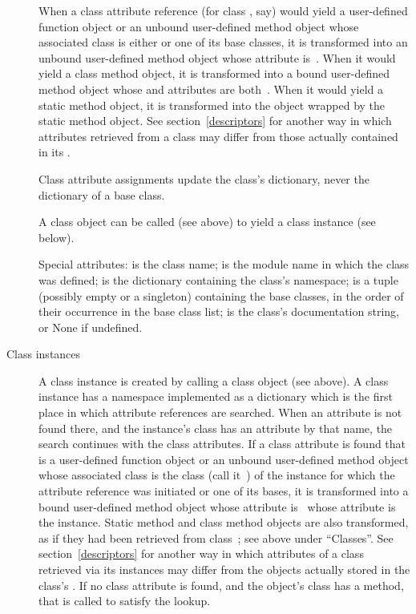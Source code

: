 \begin{description}
When a class attribute reference (for class , say)
would yield a user-defined function object or
an unbound user-defined method object whose associated class is either
 or one of its base classes, it is transformed into an unbound
user-defined method object whose  attribute is~.
When it would yield a class method object, it is transformed into
a bound user-defined method object whose  and
 attributes are both~.  When it would yield
a static method object, it is transformed into the object wrapped
by the static method object. See section~\ref{descriptors} for another
way in which attributes retrieved from a class may differ from those
actually contained in its .

Class attribute assignments update the class's dictionary, never the
dictionary of a base class.

A class object can be called (see above) to yield a class instance (see
below).

Special attributes:  is the class name;
 is the module name in which the class was defined;
 is the dictionary containing the class's namespace;
 is a tuple (possibly empty or a singleton)
containing the base classes, in the order of their occurrence in the
base class list;  is the class's documentation string,
or None if undefined.

\item[Class instances]
A class instance is created by calling a class object (see above).
A class instance has a namespace implemented as a dictionary which
is the first place in which
attribute references are searched.  When an attribute is not found
there, and the instance's class has an attribute by that name,
the search continues with the class attributes.  If a class attribute
is found that is a user-defined function object or an unbound
user-defined method object whose associated class is the class
(call it~) of the instance for which the attribute reference
was initiated or one of its bases,
it is transformed into a bound user-defined method object whose
 attribute is~ whose  attribute
is the instance. Static method and class method objects are also
transformed, as if they had been retrieved from class~;
see above under ``Classes''. See section~\ref{descriptors} for
another way in which attributes of a class retrieved via its
instances may differ from the objects actually stored in the
class's .
If no class attribute is found, and the object's class has a
 method, that is called to satisfy the lookup.


\end{description}
